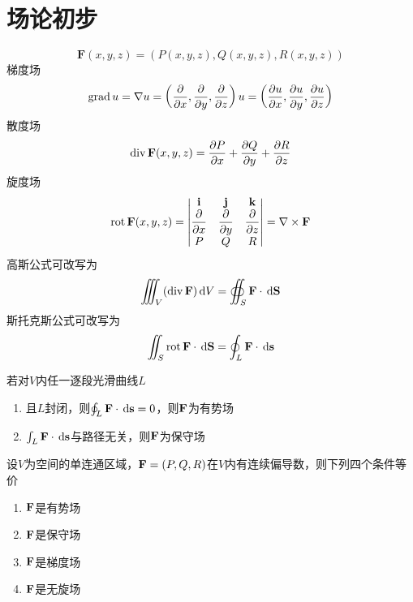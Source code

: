 
\section{场论初步}
\[\mathbf{F}(x,y,z)=(P(x,y,z),Q(x,y,z),R(x,y,z))\]
梯度场
\[\grad u=\nabla u=\lrp{\pd{}{x},\pd{}{y},\pd{}{z}}u=\lrp{\pd{u}{x},\pd{u}{y},\pd{u}{z}}\]
散度场
\[\div \mathbf{F}(x,y,z)=\pd{P}{x}+\pd{Q}{y}+\pd{R}{z}\]
旋度场
\[\rot \mathbf{F}(x,y,z)=\vmat{\vi&\vj&\vk\\\pd{}{x}&\pd{}{y}&\pd{}{z}\\P&Q&R}=\nabla\times\mathbf{F}\]
高斯公式可改写为
\[\iiint_V(\div\vF)\diff V=\oiint_S\vF\cdot\diff\vS\]
斯托克斯公式可改写为
\[\iint_S\rot\vF\cdot\diff\vS=\oint_L\vF\cdot\diff\vs\]
\begin{definition}
若对$V$内任一逐段光滑曲线$L$
\begin{enumerate}
	\item 且$L$封闭，则$\oint_L\vF\cdot\diff\vs=0$，则$\vF$为有势场
	\item $\int_L\vF\cdot\diff\vs$与路径无关，则$\vF$为保守场
\end{enumerate}
\end{definition}
\begin{theorem}
设$V$为空间的单连通区域，$\vF=(P,Q,R)$在$V$内有连续偏导数，则下列四个条件等价
\begin{enumerate}
	\item $\vF$是有势场
	\item $\vF$是保守场
	\item $\vF$是梯度场
	\item $\vF$是无旋场
\end{enumerate}
\end{theorem}